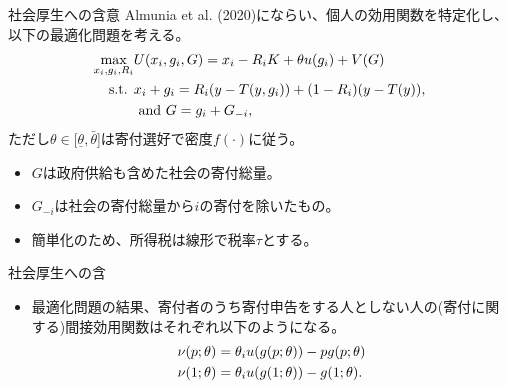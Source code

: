 \documentclass[dvipdfmx,10pt]{beamer}
\begin{document}
\begin{frame}{社会厚生への含意}
	Almunia et al. (2020)にならい、個人の効用関数を特定化し、以下の最適化問題を考える。
	\begin{align}
		\max_{x_i,g_i,R_i}&U(x_i,g_i,G)= x_i - R_iK +\theta u(g_i) + V(G)\notag\\
		\text{s.t. }&x_i + g_i = R_i(y-T(y, g_i)) + (1-R_i)(y-T(y)),\notag\\
		&\text{ and }G=g_i+G_{-i}\notag,
	\end{align}
	ただし$\theta\in[\underline{\theta},\bar{\theta}$]は寄付選好で密度$f(\cdot)$に従う。 
	\begin{itemize}
		\item $G$は政府供給も含めた社会の寄付総量。
		\item $G_{-i}$は社会の寄付総量から$i$の寄付を除いたもの。
		\item 簡単化のため、所得税は線形で税率$\tau$とする。
	\end{itemize}
\end{frame}

\begin{frame}{社会厚生への含}
	\begin{itemize}
	\item 最適化問題の結果、寄付者のうち寄付申告をする人としない人の(寄付に関する)間接効用関数はそれぞれ以下のようになる。
	\begin{align}
		\nu(p;\theta)&=\theta_i u(g(p;\theta))-pg(p;\theta)\notag\\
		\nu(1;\theta)&=\theta_i u(g(1;\theta))-g(1;\theta)\notag.
	\end{align}
\end{itemize}
\end{frame}
\end{document}
